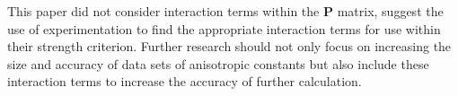 \documentclass[10pt]{article}
\begin{document}
%

This paper did not consider interaction terms within the \textbf{P} matrix, \citet{tsai_general_1971} suggest the use of
experimentation to find the appropriate interaction terms for use within their strength criterion. Further research should
not only focus on increasing the size and accuracy of data sets of anisotropic constants but also include these interaction
terms to increase the accuracy of further calculation.

\pagebreak

{}

\end{document}

